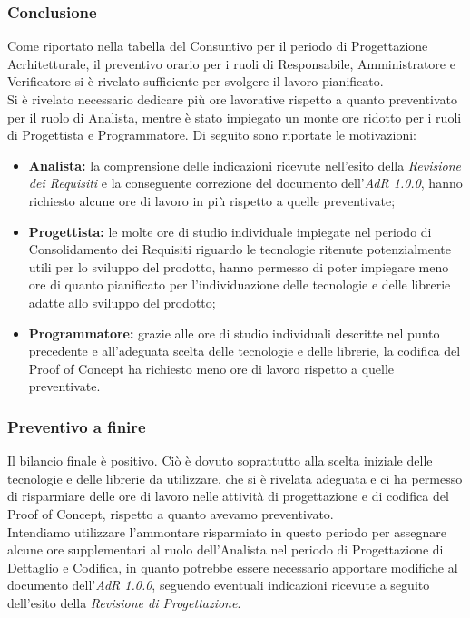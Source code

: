 	\subsubsection{Conclusione}
		Come riportato nella tabella del Consuntivo per il periodo di Progettazione Acrhitetturale, il preventivo orario per i ruoli di Responsabile, Amministratore e Verificatore si è rivelato sufficiente per svolgere il lavoro pianificato. \\
		Si è rivelato necessario dedicare più ore lavorative rispetto a quanto preventivato per il ruolo di Analista, mentre è stato impiegato un monte ore ridotto per i ruoli di Progettista e Programmatore. Di seguito sono riportate le motivazioni:
		\begin{itemize}
			\item \textbf{Analista:} la comprensione delle indicazioni ricevute nell'esito della \textit{Revisione dei Requisiti} e la conseguente correzione del documento dell'\textit{AdR{} 1.0.0}, hanno richiesto alcune ore di lavoro in più rispetto a quelle preventivate;
			\item \textbf{Progettista:} le molte ore di studio individuale impiegate nel periodo di Consolidamento dei Requisiti riguardo le tecnologie ritenute potenzialmente utili per lo sviluppo del prodotto, hanno permesso di poter impiegare meno ore di quanto pianificato per l'individuazione delle tecnologie e delle librerie adatte allo sviluppo del prodotto;
			\item \textbf{Programmatore:} grazie alle ore di studio individuali descritte nel punto precedente e all'adeguata scelta delle tecnologie e delle librerie, la codifica del Proof of Concept ha richiesto meno ore di lavoro rispetto a quelle preventivate.
		\end{itemize}
	\subsubsection{Preventivo a finire}
	Il bilancio finale è positivo. Ciò è dovuto soprattutto alla scelta iniziale delle tecnologie e delle librerie da utilizzare, che si è rivelata adeguata e ci ha permesso di risparmiare delle ore di lavoro nelle attività di progettazione e di codifica del Proof of Concept, rispetto a quanto avevamo preventivato. \\
	Intendiamo utilizzare l'ammontare risparmiato in questo periodo per assegnare alcune ore supplementari al ruolo dell'Analista nel periodo di Progettazione di Dettaglio e Codifica, in quanto potrebbe essere necessario apportare modifiche al documento dell'\textit{AdR{} 1.0.0}, seguendo eventuali indicazioni ricevute a seguito dell'esito della \textit{Revisione di Progettazione}.
	
